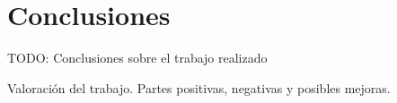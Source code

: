 \chapter{Conclusiones\label{sec:conclusiones}}

TODO: Conclusiones sobre el trabajo realizado

Valoración del trabajo. Partes positivas, negativas y posibles mejoras.